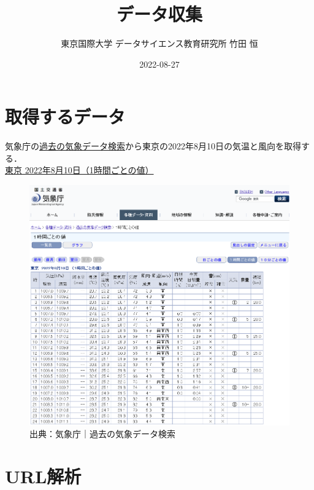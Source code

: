 \documentclass[
]{article}
\title{データ収集}
\author{東京国際大学 データサイエンス教育研究所 竹田 恒}
\date{2022-08-27}
\begin{document}
\maketitle

{
\setcounter{tocdepth}{2}
\tableofcontents
}
\hypertarget{ux53d6ux5f97ux3059ux308bux30c7ux30fcux30bf}{%
\section{取得するデータ}\label{ux53d6ux5f97ux3059ux308bux30c7ux30fcux30bf}}

気象庁の\href{https://www.data.jma.go.jp/obd/stats/etrn/index.php?prec_no=44\&block_no=47662\&year=2022\&month=08\&day=10\&view=}{過去の気象データ検索}から東京の2022年8月10日の気温と風向を取得する．\\
\href{https://www.data.jma.go.jp/obd/stats/etrn/view/hourly_s1.php?prec_no=44\&block_no=47662\&year=2022\&month=8\&day=10\&view=}{東京
2022年8月10日（1時間ごとの値）}

\begin{figure}
\centering
\includegraphics{../fig/JMA.png}
\caption{出典：気象庁｜過去の気象データ検索}
\end{figure}

\hypertarget{urlux89e3ux6790}{%
\section{URL解析}\label{urlux89e3ux6790}}
\end{document}
